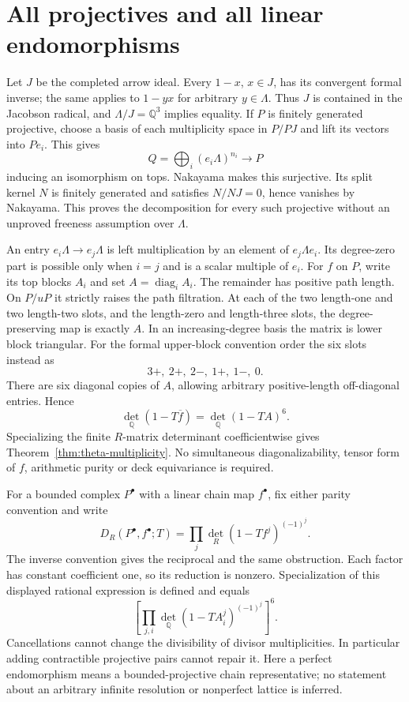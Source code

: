 \documentclass[11pt,oneside,openany]{book}
\theoremstyle{definition}\newtheorem{definition}[theorem]{Definition}
\theoremstyle{remark}\newtheorem{remark}[theorem]{Remark}
\begin{document}
\section{All projectives and all linear endomorphisms}
Let $J$ be the completed arrow ideal. Every $1-x$, $x\in J$, has its convergent formal inverse; the same applies to $1-yx$ for arbitrary $y\in\Lambda$. Thus $J$ is contained in the Jacobson radical, and $\Lambda/J=\mathbb Q^3$ implies equality. If $P$ is finitely generated projective, choose a basis of each multiplicity space in $P/PJ$ and lift its vectors into $Pe_i$. This gives
\[
 Q=\bigoplus_i(e_i\Lambda)^{n_i}\longrightarrow P
\]
inducing an isomorphism on tops. Nakayama makes this surjective. Its split kernel $N$ is finitely generated and satisfies $N/NJ=0$, hence vanishes by Nakayama. This proves the decomposition for every such projective without an unproved freeness assumption over $\Lambda$.

An entry $e_i\Lambda\to e_j\Lambda$ is left multiplication by an element of $e_j\Lambda e_i$. Its degree-zero part is possible only when $i=j$ and is a scalar multiple of $e_i$. For $f$ on $P$, write its top blocks $A_i$ and set $A=\operatorname{diag}_iA_i$. The remainder has positive path length. On $P/uP$ it strictly raises the path filtration. At each of the two length-one and two length-two slots, and the length-zero and length-three slots, the degree-preserving map is exactly $A$. In an increasing-degree basis the matrix is lower block triangular. For the formal upper-block convention order the six slots instead as
\[
 3+,\ 2+,\ 2-,\ 1+,\ 1-,\ 0.
\]
There are six diagonal copies of $A$, allowing arbitrary positive-length off-diagonal entries. Hence
\[
 \det_{\mathbb Q}(1-T\overline f)=\det_{\mathbb Q}(1-TA)^6.
\]
Specializing the finite $R$-matrix determinant coefficientwise gives Theorem~\ref{thm:theta-multiplicity}. No simultaneous diagonalizability, tensor form of $f$, arithmetic purity or deck equivariance is required.

For a bounded complex $P^\bullet$ with a linear chain map $f^\bullet$, fix either parity convention and write
\[
 D_R(P^\bullet,f^\bullet;T)=\prod_j\det_R(1-Tf^j)^{(-1)^j}.
\]
The inverse convention gives the reciprocal and the same obstruction. Each factor has constant coefficient one, so its reduction is nonzero. Specialization of this displayed rational expression is defined and equals
\[
 \left[\prod_{j,i}\det_{\mathbb Q}(1-TA_i^j)^{(-1)^j}\right]^6.
\]
Cancellations cannot change the divisibility of divisor multiplicities. In particular adding contractible projective pairs cannot repair it. Here a perfect endomorphism means a bounded-projective chain representative; no statement about an arbitrary infinite resolution or nonperfect lattice is inferred.
\end{document}
